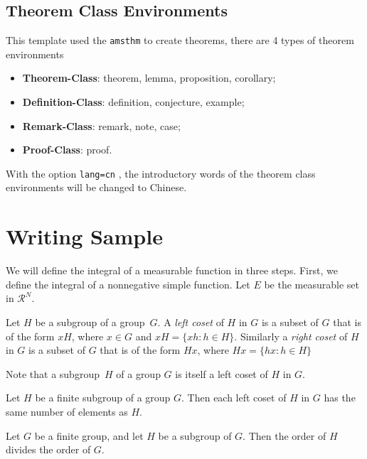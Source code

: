 \documentclass[en,hazy,screen,blue,14pt]{elegantnote}
\begin{document}
\subsection{Theorem Class Environments}

This template used the \lstinline{amsthm} to create theorems, there are 4 types of theorem environments
\begin{itemize}
  \item \textbf{Theorem-Class}: theorem, lemma, proposition, corollary;
  \item \textbf{Definition-Class}: definition, conjecture, example;
  \item \textbf{Remark-Class}: remark, note, case;
  \item \textbf{Proof-Class}: proof.
\end{itemize}

\begin{remark}
With the option \lstinline{lang=cn} , the introductory words of the theorem class environments will be changed to Chinese.
\end{remark}


\section{Writing Sample}

We will define the integral of a measurable function in three steps. First, we define the integral of a nonnegative simple function. Let $E$ be the measurable set in $\mathcal{R}^N$.


\begin{definition}
Let $H$ be a subgroup of a group~$G$.  A \emph{left coset} of $H$ in $G$ is a subset of $G$ that is of the form $xH$, where $x \in G$ and $xH = \{ xh : h \in H \}$. Similarly a \emph{right coset} of $H$ in $G$ is a subset of $G$ that is of the form $Hx$, where $Hx = \{ hx : h \in H \}$
\end{definition}

Note that a subgroup~$H$ of a group $G$ is itself a left coset of $H$ in $G$.

\begin{lemma}
Let $H$ be a finite subgroup of a group $G$.  Then each left
coset of $H$ in $G$ has the same number of elements as $H$.
\end{lemma}

\begin{theorem}
Let $G$ be a finite group, and let $H$ be a subgroup
of $G$.  Then the order of $H$ divides the order of $G$.
\end{theorem}
\end{document}
